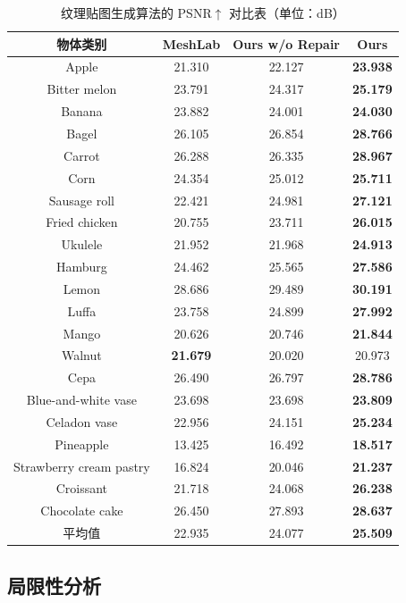 \begin{table}[!t]
\centering
\caption{纹理贴图生成算法的 PSNR$\uparrow$ 对比表（单位：dB）}
\label{tab:texture_psnr_compare}
\small
\setlength{\tabcolsep}{5pt}
\begin{tabular}{cccc}
\toprule
物体类别 & MeshLab & Ours w/o Repair & Ours \\
\midrule
Apple & 21.310 & 22.127 & \textbf{23.938} \\
Bitter melon & 23.791 & 24.317 & \textbf{25.179} \\
Banana & 23.882 & 24.001 & \textbf{24.030} \\
Bagel & 26.105 & 26.854 & \textbf{28.766} \\
Carrot & 26.288 & 26.335 & \textbf{28.967} \\
Corn & 24.354 & 25.012 & \textbf{25.711} \\
Sausage roll & 22.421 & 24.981 & \textbf{27.121} \\
Fried chicken & 20.755 & 23.711 & \textbf{26.015} \\
Ukulele & 21.952 & 21.968 & \textbf{24.913} \\
Hamburg & 24.462 & 25.565 & \textbf{27.586} \\
Lemon & 28.686 & 29.489 & \textbf{30.191} \\
Luffa & 23.758 & 24.899 & \textbf{27.992} \\
Mango & 20.626 & 20.746 & \textbf{21.844} \\
Walnut & \textbf{21.679} & 20.020 & 20.973 \\
Cepa & 26.490 & 26.797 & \textbf{28.786} \\
Blue-and-white vase & 23.698 & 23.698 & \textbf{23.809} \\
Celadon vase & 22.956 & 24.151 & \textbf{25.234} \\
Pineapple & 13.425 & 16.492 & \textbf{18.517} \\
Strawberry cream pastry & 16.824 & 20.046 & \textbf{21.237} \\
Croissant & 21.718 & 24.068 & \textbf{26.238} \\
Chocolate cake & 26.450 & 27.893 & \textbf{28.637} \\
\midrule
平均值 & 22.935 & 24.077 & \textbf{25.509} \\
\bottomrule
\end{tabular}
\end{table}




\subsection{局限性分析}

